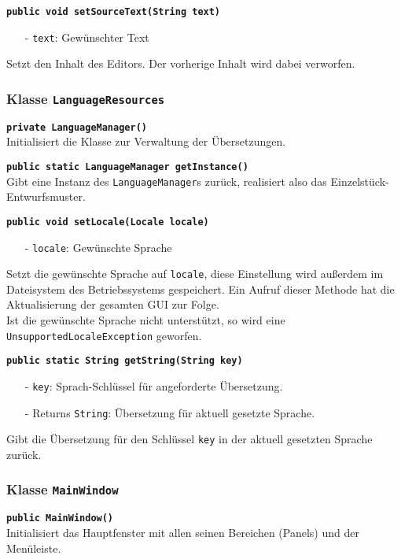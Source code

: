 \documentclass[parskip=full,11pt,twoside]{scrartcl}
\begin{document}
\textbf{\texttt{public void setSourceText(String text)}}
\begin{itemize}[noitemsep]
	\item[-] \texttt{text}: Gewünschter Text
\end{itemize}
Setzt den Inhalt des Editors. Der vorherige Inhalt wird dabei verworfen.

\subsubsection{Klasse \texttt{LanguageResources}}

\textbf{\texttt{private LanguageManager()}}\\
Initialisiert die Klasse zur Verwaltung der Übersetzungen.

\textbf{\texttt{public static LanguageManager getInstance()}}\\
Gibt eine Instanz des \texttt{LanguageManager}s zurück, realisiert also das Einzelstück-Entwurfsmuster.

\textbf{\texttt{public void setLocale(Locale locale)}}
\begin{itemize}[noitemsep]
	\item[-] \texttt{locale}: Gewünschte Sprache
\end{itemize}
Setzt die gewünschte Sprache auf \texttt{locale}, diese Einstellung wird außerdem im Dateisystem des Betriebssystems gespeichert. Ein Aufruf dieser Methode hat die Aktualisierung der gesamten GUI zur Folge.\\
Ist die gewünschte Sprache nicht unterstützt, so wird eine \texttt{UnsupportedLocaleException} geworfen.

\textbf{\texttt{public static String getString(String key)}}
\begin{itemize}[noitemsep]
	\item[-] \texttt{key}: Sprach-Schlüssel für angeforderte Übersetzung.
	\item[-] Returns \texttt{String}: Übersetzung für aktuell gesetzte Sprache.
\end{itemize}
Gibt die Übersetzung für den Schlüssel \texttt{key} in der aktuell gesetzten Sprache zurück.

\subsubsection{Klasse \texttt{MainWindow}}

\textbf{\texttt{public MainWindow()}}\\
Initialisiert das Hauptfenster mit allen seinen Bereichen (Panels) und der Menüleiste.
\end{document}
